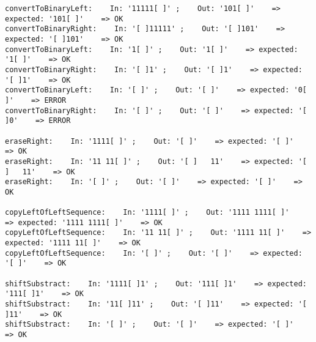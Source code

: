 \documentclass[a4paper,11pt]{article}
\begin{document}
\begin{tiny}
\begin{verbatim}
convertToBinaryLeft:    In: '11111[ ]' ;    Out: '101[ ]'    => expected: '101[ ]'    => OK
convertToBinaryRight:    In: '[ ]11111' ;    Out: '[ ]101'    => expected: '[ ]101'    => OK
convertToBinaryLeft:    In: '1[ ]' ;    Out: '1[ ]'    => expected: '1[ ]'    => OK
convertToBinaryRight:    In: '[ ]1' ;    Out: '[ ]1'    => expected: '[ ]1'    => OK
convertToBinaryLeft:    In: '[ ]' ;    Out: '[ ]'    => expected: '0[ ]'    => ERROR
convertToBinaryRight:    In: '[ ]' ;    Out: '[ ]'    => expected: '[ ]0'    => ERROR

eraseRight:    In: '1111[ ]' ;    Out: '[ ]'    => expected: '[ ]'    => OK
eraseRight:    In: '11 11[ ]' ;    Out: '[ ]   11'    => expected: '[ ]   11'    => OK
eraseRight:    In: '[ ]' ;    Out: '[ ]'    => expected: '[ ]'    => OK

copyLeftOfLeftSequence:    In: '1111[ ]' ;    Out: '1111 1111[ ]'    => expected: '1111 1111[ ]'    => OK
copyLeftOfLeftSequence:    In: '11 11[ ]' ;    Out: '1111 11[ ]'    => expected: '1111 11[ ]'    => OK
copyLeftOfLeftSequence:    In: '[ ]' ;    Out: '[ ]'    => expected: '[ ]'    => OK

shiftSubstract:    In: '1111[ ]1' ;    Out: '111[ ]1'    => expected: '111[ ]1'    => OK
shiftSubstract:    In: '11[ ]11' ;    Out: '[ ]11'    => expected: '[ ]11'    => OK
shiftSubstract:    In: '[ ]' ;    Out: '[ ]'    => expected: '[ ]'    => OK
\end{verbatim}
\end{tiny}
\end{document}
